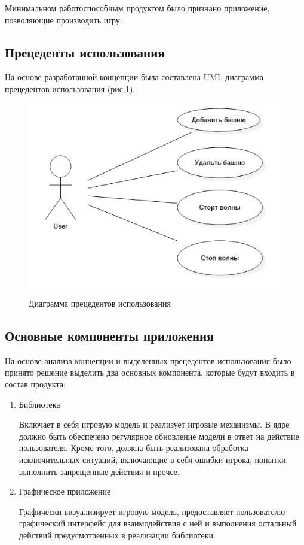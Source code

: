 Минимальном работоспособным продуктом было признано приложение, позволяющие производить игру. 

\subsection{Прецеденты использования}

На основе разработанной концепции была составлена UML диаграмма прецедентов использования (рис.\ref{pic:use_case}).

\begin{figure}[H]
	\begin{center}
		\includegraphics[width=1\textwidth]{../image/use_case.png}
		\caption{Диаграмма прецедентов использования}
		\label{pic:use_case}
	\end{center}
\end{figure}

\subsection{Основные компоненты приложения}

На основе анализа концепции и выделенных прецедентов использования было принято решение выделить два основных компонента, которые будут входить в состав продукта:

\begin{enumerate}
	\item Библиотека
	
	 Включает в себя игровую модель и реализует игровые механизмы. В ядре должно быть обеспечено регулярное обновление модели в ответ на действие пользователя. Кроме того, должна быть реализована обработка исключительных ситуаций, включающие в себя ошибки игрока, попытки выполнить запрещенные действия и прочее.
	
	\item Графическое приложение 

	Графически визуализирует игровую модель, предоставляет пользователю графический интерфейс для взаимодействия с ней и выполнения остальный действий предусмотренных в реализации библиотеки. 
\end{enumerate}

